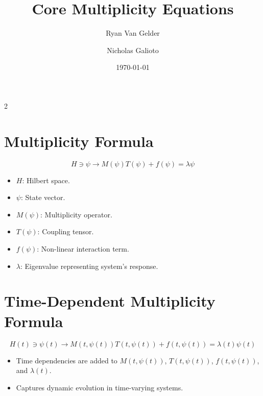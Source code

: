 \documentclass{article}
\theoremstyle{plain}
\begin{document}
\begin{itemize}
\title{Core Multiplicity Equations}
\author[1]{Ryan Van Gelder}
\author[2]{Nicholas Galioto}
\date{\today}

\maketitle
 \begin{multicols}{2}
\begin{singlespace}
\tableofcontents
\end{singlespace}
\end{multicols}
\section{Multiplicity Formula}
\begin{equation}
H \ni \psi \to M(\psi)T(\psi) + f(\psi) = \lambda \psi
\end{equation}
\begin{itemize}
    \item \( H \): Hilbert space.
    \item \( \psi \): State vector.
    \item \( M(\psi) \): Multiplicity operator.
    \item \( T(\psi) \): Coupling tensor.
    \item \( f(\psi) \): Non-linear interaction term.
    \item \( \lambda \): Eigenvalue representing system's response.
\end{itemize}

\section{Time-Dependent Multiplicity Formula}
\begin{equation}
H(t) \ni \psi(t) \to M(t, \psi(t))T(t, \psi(t)) + f(t, \psi(t)) = \lambda(t)\psi(t)
\end{equation}
\begin{itemize}
    \item Time dependencies are added to \( M(t, \psi(t)) \), \( T(t, \psi(t)) \), \( f(t, \psi(t)) \), and \( \lambda(t) \).
    \item Captures dynamic evolution in time-varying systems.
\end{itemize}


\end{itemize}
\end{document}
